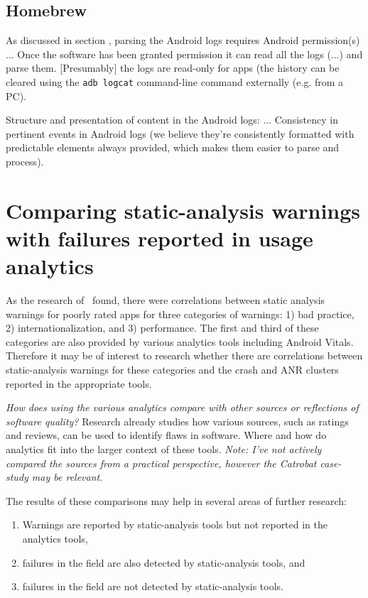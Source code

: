 \subsection{Homebrew}
As discussed in section \href{sec:platform-level-analytics}{\emph{}}, parsing the Android logs requires Android permission(s) ... Once the software has been granted permission it can read all the logs (...) and parse them. [Presumably] the logs are read-only for apps (the history can be cleared using the \texttt{adb logcat} command-line command externally (e.g. from a PC).

Structure and presentation of content in the Android logs: ...
Consistency in pertinent events in Android logs (we believe they're consistently formatted with predictable elements always provided, which makes them easier to parse and process).



\section{Comparing static-analysis warnings with failures reported in usage analytics}
As the research of~\citep{khalid2016_examining_the_relationship_between_findbugs_warnings_and_app_ratings} found, there were correlations between static analysis warnings for poorly rated apps for three categories of warnings: 1) bad practice, 2) internationalization, and 3) performance. The first and third of these categories are also provided by various analytics tools including Android Vitals. Therefore it may be of interest to research whether there are correlations between static-analysis warnings for these categories and the crash and ANR clusters reported in the appropriate tools. 

\emph{How does using the various analytics compare with other sources or reflections of software quality?} Research already studies how various sources, such as ratings and reviews, can be used to identify flaws in software. Where and how do analytics fit into the larger context of these tools. \emph{Note: I've not actively compared the sources from a practical perspective, however the Catrobat case-study may be relevant}.

The results of these comparisons may help in several areas of further research:
\begin{enumerate}
    \item Warnings are reported by static-analysis tools but not reported in the analytics tools,
    \item failures in the field are also detected by static-analysis tools, and
    \item failures in the field are not detected by static-analysis tools.
\end{enumerate}

